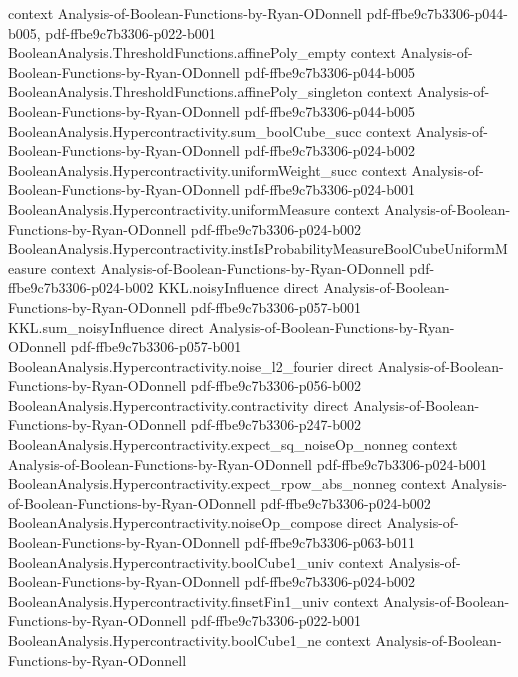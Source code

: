 \begin{lemma}
  {context}
  {Analysis-of-Boolean-Functions-by-Ryan-ODonnell}
  {pdf-ffbe9c7b3306-p044-b005,
    pdf-ffbe9c7b3306-p022-b001}
\proofstep
  {BooleanAnalysis.ThresholdFunctions.affinePoly_empty}
  {context}
  {Analysis-of-Boolean-Functions-by-Ryan-ODonnell}
  {pdf-ffbe9c7b3306-p044-b005}
\proofstep
  {BooleanAnalysis.ThresholdFunctions.affinePoly_singleton}
  {context}
  {Analysis-of-Boolean-Functions-by-Ryan-ODonnell}
  {pdf-ffbe9c7b3306-p044-b005}
\proofstep
  {BooleanAnalysis.Hypercontractivity.sum_boolCube_succ}
  {context}
  {Analysis-of-Boolean-Functions-by-Ryan-ODonnell}
  {pdf-ffbe9c7b3306-p024-b002}
\proofstep
  {BooleanAnalysis.Hypercontractivity.uniformWeight_succ}
  {context}
  {Analysis-of-Boolean-Functions-by-Ryan-ODonnell}
  {pdf-ffbe9c7b3306-p024-b001}
\proofstep
  {BooleanAnalysis.Hypercontractivity.uniformMeasure}
  {context}
  {Analysis-of-Boolean-Functions-by-Ryan-ODonnell}
  {pdf-ffbe9c7b3306-p024-b002}
\proofstep
  {BooleanAnalysis.Hypercontractivity.instIsProbabilityMeasureBoolCubeUniformMeasure}
  {context}
  {Analysis-of-Boolean-Functions-by-Ryan-ODonnell}
  {pdf-ffbe9c7b3306-p024-b002}
\proofstep
  {KKL.noisyInfluence}
  {direct}
  {Analysis-of-Boolean-Functions-by-Ryan-ODonnell}
  {pdf-ffbe9c7b3306-p057-b001}
\proofstep
  {KKL.sum_noisyInfluence}
  {direct}
  {Analysis-of-Boolean-Functions-by-Ryan-ODonnell}
  {pdf-ffbe9c7b3306-p057-b001}
\proofstep
  {BooleanAnalysis.Hypercontractivity.noise_l2_fourier}
  {direct}
  {Analysis-of-Boolean-Functions-by-Ryan-ODonnell}
  {pdf-ffbe9c7b3306-p056-b002}
\proofstep
  {BooleanAnalysis.Hypercontractivity.contractivity}
  {direct}
  {Analysis-of-Boolean-Functions-by-Ryan-ODonnell}
  {pdf-ffbe9c7b3306-p247-b002}
\proofstep
  {BooleanAnalysis.Hypercontractivity.expect_sq_noiseOp_nonneg}
  {context}
  {Analysis-of-Boolean-Functions-by-Ryan-ODonnell}
  {pdf-ffbe9c7b3306-p024-b001}
\proofstep
  {BooleanAnalysis.Hypercontractivity.expect_rpow_abs_nonneg}
  {context}
  {Analysis-of-Boolean-Functions-by-Ryan-ODonnell}
  {pdf-ffbe9c7b3306-p024-b002}
\proofstep
  {BooleanAnalysis.Hypercontractivity.noiseOp_compose}
  {direct}
  {Analysis-of-Boolean-Functions-by-Ryan-ODonnell}
  {pdf-ffbe9c7b3306-p063-b011}
\proofstep
  {BooleanAnalysis.Hypercontractivity.boolCube1_univ}
  {context}
  {Analysis-of-Boolean-Functions-by-Ryan-ODonnell}
  {pdf-ffbe9c7b3306-p024-b002}
\proofstep
  {BooleanAnalysis.Hypercontractivity.finsetFin1_univ}
  {context}
  {Analysis-of-Boolean-Functions-by-Ryan-ODonnell}
  {pdf-ffbe9c7b3306-p022-b001}
\proofstep
  {BooleanAnalysis.Hypercontractivity.boolCube1_ne}
  {context}
  {Analysis-of-Boolean-Functions-by-Ryan-ODonnell}

\end{lemma}
